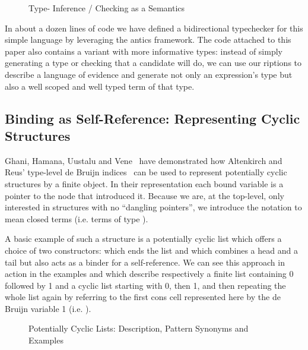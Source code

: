 \begin{figure}[h]
\caption{Type- Inference / Checking as a Semantics}
\end{figure}

In about a dozen lines of code we have defined a bidirectional typechecker for
this simple language by leveraging the antics framework. The code attached
to this paper also contains a variant with more informative types: instead of simply
generating a type or checking that a candidate will do, we can use our riptions
to describe a language of evidence and generate not only an expression's type but
also a well scoped and well typed term of that type.

\subsection{Binding as Self-Reference: Representing Cyclic Structures}\label{def:colist}

Ghani, Hamana, Uustalu and Vene~\citeyear{ghani2006representing} have
demonstrated how Altenkirch and Reus' type-level de Bruijn
indices~\citeyear{altenkirch1999monadic} can be used to represent
potentially cyclic structures by a finite object. In their
representation each bound variable is a pointer to the node
that introduced it. Because we are, at the top-level, only
interested in structures with no ``dangling pointers'', we introduce
the notation   to mean closed terms (i.e. terms of type
   \AIC{[]}).

A basic example of such a structure is a potentially cyclic list which
offers a choice of two constructors: \AIC{[]} which ends the list and
\AIC{\_:\!:\_} which combines a head and a tail but also acts as a binder
for a self-reference. We can see this approach in action in the examples
\AF{[0, 1]} and  which describe respectively a finite list containing
0 followed by 1 and a cyclic list starting with 0, then 1, and then
repeating the whole list again by referring to the first cons cell
represented here by the de Bruijn variable 1 (i.e.  ).

\begin{figure}[h]
\begin{minipage}{0.55\textwidth}
\end{minipage}\hspace{2em}
\begin{minipage}{0.35\textwidth}
\end{minipage}
\caption{Potentially Cyclic Lists: Description, Pattern Synonyms and Examples}
\end{figure}

